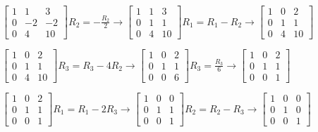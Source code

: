 \documentclass{article}
\begin{document}
{\begin{center}
	$\begin{bmatrix}
		1 & 1 & 3 \\
		0 & -2 & -2 \\
		0 & 4 & 10
	\end{bmatrix} R_{2} = -\frac{R_{2}}{2} \rightarrow 
	\begin{bmatrix}
			1 & 1 & 3 \\
			0 & 1 & 1 \\
			0 & 4 & 10
		\end{bmatrix} R_{1} = R_{1} - R_{2} \rightarrow
	\begin{bmatrix}
		1 & 0 & 2 \\
		0 & 1 & 1 \\
		0 & 4 & 10
	\end{bmatrix} $ 
	
\end{center}

\begin{center}
$
	\begin{bmatrix}
		1 & 0 & 2 \\
		0 & 1 & 1 \\
		0 & 4 & 10
	\end{bmatrix} R_{3} = R_{3} - 4R_{2} \rightarrow
\begin{bmatrix}
	1 & 0 & 2 \\
	0 & 1 & 1 \\
	0 & 0 & 6 
	\end{bmatrix} R_{3} = \frac{R_{3}}{6} \rightarrow
\begin{bmatrix}
	1 & 0 & 2 \\
	0 & 1 & 1 \\
	0 & 0 & 1 
\end{bmatrix} $ 
	
\end{center}

\begin{center}
	$
	\begin{bmatrix}
		1 & 0 & 2 \\
		0 & 1 & 1 \\
		0 & 0 & 1
	\end{bmatrix} R_{1} = R_{1} - 2R_{3} \rightarrow
	\begin{bmatrix}
		1 & 0 & 0 \\
		0 & 1 & 1 \\
		0 & 0 & 1 
	\end{bmatrix} R_{2} = R_{2} - R_{3} \rightarrow
	\begin{bmatrix}
		1 & 0 & 0 \\
		0 & 1 & 0 \\
		0 & 0 & 1 
	\end{bmatrix} $ 
	

\end{center}}
\end{document}
